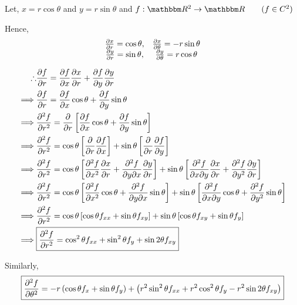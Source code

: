 \documentclass[Analysis-3]{subfiles}
\begin{document}
Let, $x = r\cos{\theta}$ and $y= r\sin{\theta}$ and $f : \R^2 \to \R \qquad ( f \in C^2) $

Hence,
\[\begin{matrix}
		\pdv{x}{r} = \cos{\theta}, & \pdv{x}{\theta} = -r\sin{\theta} \\
		\pdv{y}{r} = \sin{\theta}, & \pdv{y}{\theta} = r\cos{\theta}
	\end{matrix}\]

\begin{align*}
	\therefore & \pdv{f}{r} = \pdv{f}{x} \pdv{x}{r} + \pdv{f}{y}\pdv{y}{r}                                                                                                                               \\
	\implies   & \pdv{f}{r} = \pdv{f}{x} \cos{\theta} + \pdv{f}{y}\sin{\theta}                                                                                                                           \\
	\implies   & \pdv[2]{f}{r} = \pdv{}{r} \left[\pdv{f}{x} \cos{\theta} + \pdv{f}{y} \sin{\theta} \right]                                                                                               \\
	\implies   & \pdv[2]{f}{r} = \cos{\theta} \left[\pdv{}{r} \pdv{f}{x}\right] + \sin{\theta} \left[\pdv{}{r} \pdv{f}{y} \right]                                                                        \\
	\implies   & \pdv[2]{f}{r} = \cos{\theta} \left[\pdv[2]{f}{x} \pdv{x}{r} + \pdv{f}{y}{x} \pdv{y}{r} \right] + \sin{\theta} \left[\pdv{f}{x}{y} \pdv{x}{r} + \pdv[2]{f}{y} \pdv{y}{r} \right]         \\
	\implies   & \pdv[2]{f}{r} = \cos{\theta} \left[\pdv[2]{f}{x} \cos{\theta} + \pdv{f}{y}{x} \sin{\theta} \right] + \sin{\theta} \left[\pdv{f}{x}{y} \cos{\theta} + \pdv[2]{f}{y} \sin{\theta} \right] \\
	\implies   & \pdv[2]{f}{r} = \cos{\theta} \left[\cos{\theta} f_{xx} + \sin{\theta} f_{xy} \right] + \sin{\theta} \left[\cos{\theta} f_{xy} + \sin{\theta} f_{y} \right]                              \\
	\implies   & \boxed{\pdv[2]{f}{r} = \cos^2 \theta f_{xx} + \sin^2 \theta f_{y} + \sin 2 \theta f_{xy}}
\end{align*}


Similarly, \[ \boxed{\pdv[2]{f}{\theta} = -r \left( \cos{\theta} f_x + \sin{\theta} f_y \right) + \left( r^2\sin^2 \theta f_{xx} + r^2\cos^2 \theta f_{y} - r^2\sin 2 \theta f_{xy} \right)} \]
\end{document}
